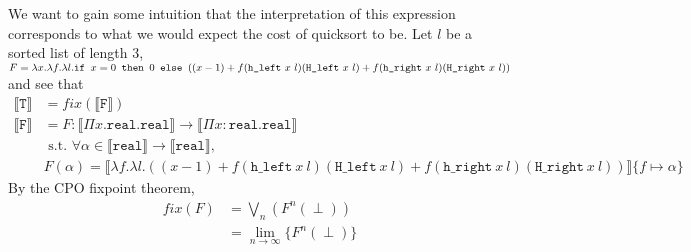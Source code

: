  We want to gain some intuition that the interpretation of this expression corresponds to what we would expect
 the cost of quicksort to be. Let $l$ be a sorted list of length $3$, $F = \lambda x. \lambda f. \lambda l. \texttt{if } x = 0 \texttt{ then } 0 \texttt{ else } ((x-1) + f(\texttt{h\_left} \ x \ l)(\texttt{H\_left} \ x \ l) + f(\texttt{h\_right} \ x \ l)(\texttt{H\_right} \ x \ l))$  and see that
 \begin{align*}
 \llbracket \texttt{T} \rrbracket &= fix(\llbracket \texttt{F} \rrbracket) \\
 \llbracket \texttt{F} \rrbracket &= F : \llbracket \Pi x.\texttt{real}.\texttt{real}\rrbracket \rightarrow \llbracket \Pi x:\texttt{real} . \texttt{real}\rrbracket \\ 
 &\text{ s.t. } \forall \alpha \in \llbracket \texttt{real}\rrbracket \rightarrow \llbracket \texttt{real} \rrbracket, \\   
 &F(\alpha) = \llbracket\lambda f. \lambda l. ((x-1) 
		+ f(\texttt{h\_left} \ x \ l)(\texttt{H\_left} \ x \ l) + f(\texttt{h\_right} \ x \ l)(\texttt{H\_right} \ x \ l))\rrbracket\{f \mapsto \alpha\} 
 \end{align*}
 By the CPO fixpoint theorem,  
\begin{align*}
 fix(F) &= \bigvee_n(F^n (\perp)) \\
&= \lim_{n \to \infty}\{F^n (\perp)\}
 \end{align*}
 
 
 
 